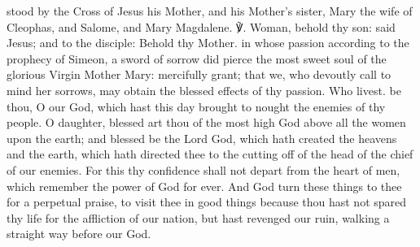 

\introit
{} stood by the Cross of Jesus his Mother, and his Mother's sister, Mary the wife of Cleophas, and Salome, and Mary Magdalene. ℣. Woman, behold thy son: said Jesus; and to the disciple: Behold thy Mother.
\collect
{} in whose passion according to the prophecy of Simeon, a sword of sorrow did pierce the most sweet soul of the glorious Virgin Mother Mary: mercifully grant; that we, who devoutly call to mind her sorrows, may obtain the blessed effects of thy passion. Who livest.
 be thou, O our God, which hast this day brought to nought the enemies of thy people. O daughter, blessed art thou of the most high God above all the women upon the earth; and blessed be the Lord God, which hath created the heavens and the earth, which hath directed thee to the cutting off of the head of the chief of our enemies. For this thy confidence shall not depart from the heart of men, which remember the power of God for ever. And God turn these things to thee for a perpetual praise, to visit thee in good things because thou hast not spared thy life for the affliction of our nation, but hast revenged our ruin, walking a straight way before our God.
\label{dolorosa}
